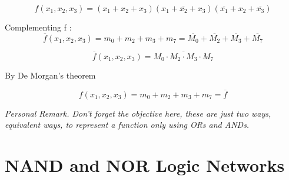 \documentclass[12pt,openany, tikz,border=10pt]{book}
\begin{document}
			      	\[
			      		f(x_1, x_2, x_3) = (x_1 + x_2 + x_3)(x_1 + \overline{x_2} + x_3)(\overline{x_1} + x_2 + \overline{x_3})
			      	\]
			      	
			      	
			      	Complementing f :
			      	\[
			      		\overline{f}(x_1, x_2, x_3) = m_0 + m_2 + m_3 + m_7 = \overline{M_0} + \overline{M_2} + \overline{M_3} + \overline{M_7}
			      	\]
			      	
			      	\[
			      		\overline{f}(x_1, x_2, x_3) = \overline{M_0 \cdot M_2 \cdot M_3 \cdot M_7}
			      	\]
			      	
			      	By De Morgan's theorem
			      	
			      	\[
			      		f(x_1, x_2, x_3) = m_0 + m_2 + m_3 + m_7 = \overline{f}
			      	\]
			      	
			      	\textit{Personal Remark. Don't forget the objective here, these are just two ways, equivalent ways, to represent a function only using ORs and ANDs.}
			      	
			      	\section{NAND and NOR Logic Networks}
			      	
			      	
\end{document}
